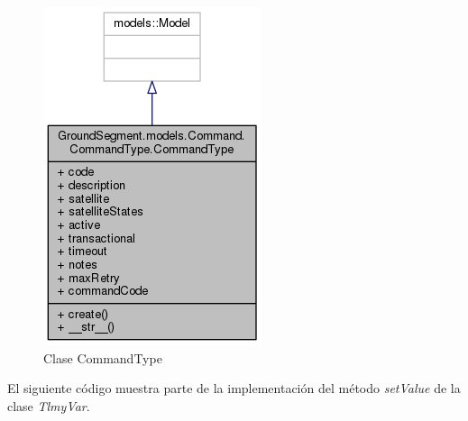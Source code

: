 \documentclass[twoside,twocolumn]{article}
\begin{document}
\begin{figure}[!htb]
\begin{minipage}{0.2\textwidth}
        \centering
        \includegraphics[width=0.5\linewidth]{Imagenes/CommandType.png}
        \caption{Clase CommandType}
        \label{fig:prob1_6_1}
    \end{minipage}
\end{figure}

El siguiente código muestra parte de la implementación del método \textit{setValue} de la clase \textit{TlmyVar}. 
\end{document}
